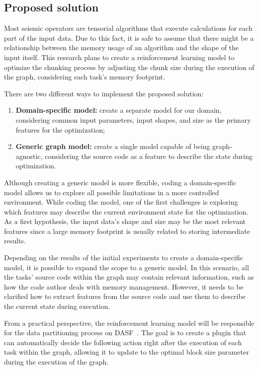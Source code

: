 \subsection{Proposed solution}
\label{subsec:proposed-solution}

Most seismic operators are tensorial algorithms that execute calculations for each part of the input data.
Due to this fact, it is safe to assume that there might be a relationship between the memory usage of an algorithm and the shape of the input itself.
This research plans to create a reinforcement learning model to optimize the chunking process by adjusting the chunk size during the execution of the graph, considering each task's memory footprint.

There are two different ways to implement the proposed solution:

\begin{enumerate}
  \item \textbf{Domain-specific model:} create a separate model for our domain, considering common input parameters, input shapes, and size as the primary features for the optimization;
  \item \textbf{Generic graph model:} create a single model capable of being graph-agnostic, considering the source code as a feature to describe the state during optimization.
\end{enumerate}

Although creating a generic model is more flexible, coding a domain-specific model allows us to explore all possible limitations in a more controlled environment.
While coding the model, one of the first challenges is exploring which features may describe the current environment state for the optimization.
As a first hypothesis, the input data's shape and size may be the most relevant features since a large memory footprint is usually related to storing intermediate results.

Depending on the results of the initial experiments to create a domain-specific model, it is possible to expand the scope to a generic model.
In this scenario, all the tasks' source code within the graph may contain relevant information, such as how the code author deals with memory management.
However, it needs to be clarified how to extract features from the source code and use them to describe the current state during execution.

From a practical perspective, the reinforcement learning model will be responsible for the data partitioning process on \ac{DASF}~\cite{dasf}.
The goal is to create a plugin that can automatically decide the following action right after the execution of each task within the graph, allowing it to update to the optimal block size parameter during the execution of the graph.